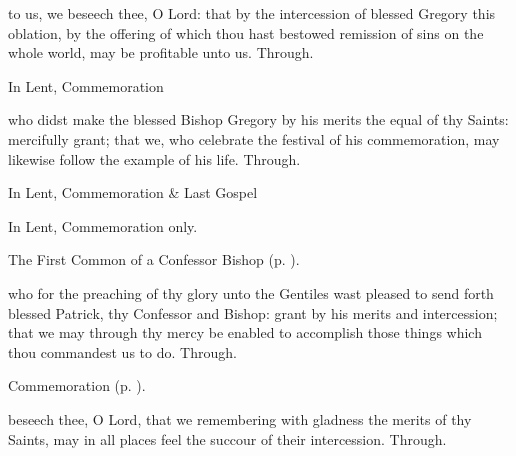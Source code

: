 
\secret
{} to us, we beseech thee, O Lord: that by the intercession of blessed Gregory this oblation, by the offering of which thou hast bestowed remission of sins on the whole world, may be profitable unto us. Through.
\begin{rubric}
    In Lent, Commemoration %
\end{rubric}


\postcommunion
{} who didst make the blessed Bishop Gregory by his merits the equal of thy Saints: mercifully grant; that we, who celebrate the festival of his commemoration, may likewise follow the example of his life. Through.

\begin{rubric}
    In Lent, Commemoration \& Last Gospel 
\end{rubric}


\clearpage
{}

\begin{rubric}
	In Lent, Commemoration only.
\end{rubric}

\begin{rubric}
	The First Common of a Confessor Bishop (p. \pageref{CommonConfessorBishopI}).
\end{rubric}

\collect
{} who for the preaching of thy glory unto the Gentiles wast pleased to send forth blessed Patrick, thy Confessor and Bishop: grant by his merits and intercession; that we may through thy mercy be enabled to accomplish those things which thou commandest us to do. Through.

\begin{rubric}
    Commemoration  (p. \pageref{ArimatheanCollect}).
\end{rubric}

\secret
{} beseech thee, O Lord, that we remembering with gladness the merits of thy Saints, may in all places feel the succour of their intercession. Through.

